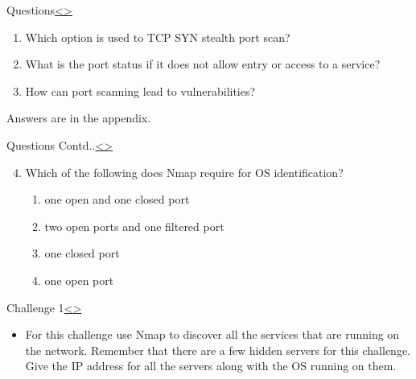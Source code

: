 \documentclass[12pt]{extarticle}
\newenvironment{instructionblock}{\Large\bgroup}{\egroup}
\begin{document}
\pagebreak
\begin{slide}{Questions}{\hyperref[slide 9]{\textless}\hyperref[slide 11]{\textgreater}}
\begin{instructionblock}
\begin{enumerate}
\item Which option is used to TCP SYN stealth port scan?
\item What is the port status if it does not allow entry or access to a service?
\item How can port scanning lead to vulnerabilities?
\end{enumerate}
\end{instructionblock}
\end{slide}

Answers are in the appendix.

\pagebreak
\begin{slide}{Questions Contd..}{\hyperref[slide 10]{\textless}\hyperref[slide 12]{\textgreater}}
\vskip 5pt
\begin{instructionblock}
\begin{enumerate}
\setcounter{enumi}{3}
\item Which of the following does Nmap require for OS identification?
	\begin{enumerate}
		\item one open and one closed port
		\item two open ports and one filtered port
		\item one closed port
		\item one open port
	\end{enumerate}
\end{enumerate}
\end{instructionblock}
\end{slide}

\pagebreak
\begin{slide}{Challenge 1}{\hyperref[slide 11]{\textless}\hyperref[slide 13]{\textgreater}}
	\vskip 5pt
	\begin{instructionblock}
		\begin{itemize}
			\item For this challenge use Nmap to discover all the services that are running on the network. Remember that there are a few hidden servers for this challenge. Give the IP address for all the servers along with the OS running on them.
		\end{itemize}
	\end{instructionblock}
\end{slide}
\end{document}
